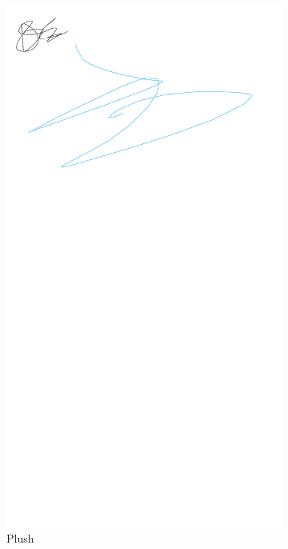 \documentclass{article}
\begin{document}
\begin{figure}[H]
\begin{subfigure}{0.32\textwidth}
        \includegraphics[width=\textwidth]{plush.png}
        \caption{Plush}
    \end{subfigure}
    \begin{subfigure}{0.32\textwidth}

\end{subfigure}
\end{figure}
\end{document}

